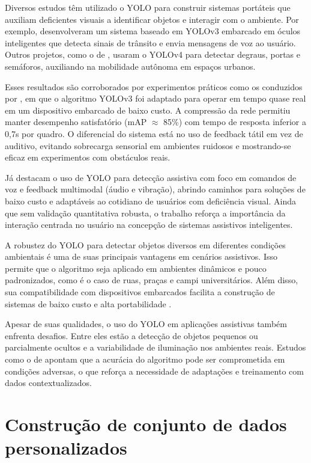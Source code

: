 Diversos estudos têm utilizado o YOLO para construir sistemas portáteis que auxiliam deficientes visuais a identificar objetos e interagir com o ambiente. Por exemplo,  desenvolveram um sistema baseado em YOLOv3 embarcado em óculos inteligentes que detecta sinais de trânsito e envia mensagens de voz ao usuário. Outros projetos, como o de , usaram o YOLOv4 para detectar degraus, portas e semáforos, auxiliando na mobilidade autônoma em espaços urbanos.

Esses resultados são corroborados por experimentos práticos como os conduzidos por , em que o algoritmo YOLOv3 foi adaptado para operar em tempo quase real em um dispositivo embarcado de baixo custo. A compressão da rede permitiu manter desempenho satisfatório (mAP $\approx$ 85\%) com tempo de resposta inferior a 0,7s por quadro. O diferencial do sistema está no uso de feedback tátil em vez de auditivo, evitando sobrecarga sensorial em ambientes ruidosos e mostrando-se eficaz em experimentos com obstáculos reais.

Já  destacam o uso de YOLO para detecção assistiva com foco em comandos de voz e feedback multimodal (áudio e vibração), abrindo caminhos para soluções de baixo custo e adaptáveis ao cotidiano de usuários com deficiência visual. Ainda que sem validação quantitativa robusta, o trabalho reforça a importância da interação centrada no usuário na concepção de sistemas assistivos inteligentes.

A robustez do YOLO para detectar objetos diversos em diferentes condições ambientais é uma de suas principais vantagens em cenários assistivos. Isso permite que o algoritmo seja aplicado em ambientes dinâmicos e pouco padronizados, como é o caso de ruas, praças e campi universitários. Além disso, sua compatibilidade com dispositivos embarcados facilita a construção de sistemas de baixo custo e alta portabilidade \cite{bochkovskiy2020}.

Apesar de suas qualidades, o uso do YOLO em aplicações assistivas também enfrenta desafios. Entre eles estão a detecção de objetos pequenos ou parcialmente ocultos e a variabilidade de iluminação nos ambientes reais. Estudos como o de  apontam que a acurácia do algoritmo pode ser comprometida em condições adversas, o que reforça a necessidade de adaptações e treinamento com dados contextualizados.

\section{\textbf{Construção de conjunto de dados personalizados}}

